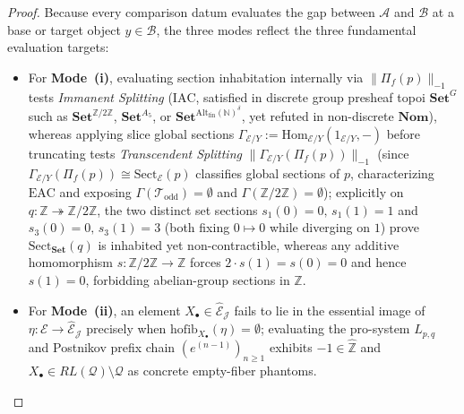 \documentclass[10pt,twoside,openright]{book}
\theoremstyle{crmplain}
\theoremstyle{crmdef}
\theoremstyle{crmremark}
\begin{document}
\begin{proof}
Because every comparison datum evaluates the gap between $\mathcal{A}$ and $\mathcal{B}$ at a base or target object $y \in \mathcal{B}$, the three modes reflect the three fundamental evaluation targets:
\begin{itemize}[leftmargin=1.4em,noitemsep,topsep=2pt]
  \item For \textbf{Mode~(i)}, evaluating section inhabitation internally via $\|\Pi_f(p)\|_{-1}$ tests \emph{Immanent Splitting} ($\mathrm{IAC}$, satisfied in discrete group presheaf topoi $\mathbf{Set}^G$ such as $\mathbf{Set}^{\mathbb{Z}/2\mathbb{Z}}$, $\mathbf{Set}^{A_5}$, or $\mathbf{Set}^{\mathrm{Alt}_{\mathrm{fin}}(\mathbb{N})^\delta}$, yet refuted in non-discrete $\mathbf{Nom}$), whereas applying slice global sections $\Gamma_{\mathcal{E}/Y} := \mathrm{Hom}_{\mathcal{E}/Y}(1_{\mathcal{E}/Y}, -)$ before truncating tests \emph{Transcendent Splitting} $\|\Gamma_{\mathcal{E}/Y}(\Pi_f(p))\|_{-1}$ (since $\Gamma_{\mathcal{E}/Y}(\Pi_f(p)) \cong \mathrm{Sect}_{\mathcal{E}}(p)$ classifies global sections of $p$, characterizing $\mathrm{EAC}$ and exposing $\Gamma(\mathcal{T}_{\mathrm{odd}}) = \emptyset$ and $\Gamma(\mathbb{Z}/2\mathbb{Z}) = \emptyset$); explicitly on $q : \mathbb{Z} \twoheadrightarrow \mathbb{Z}/2\mathbb{Z}$, the two distinct set sections $s_1(0) = 0,\, s_1(1) = 1$ and $s_3(0) = 0,\, s_3(1) = 3$ (both fixing $0 \mapsto 0$ while diverging on $1$) prove $\mathrm{Sect}_{\mathbf{Set}}(q)$ is inhabited yet non-contractible, whereas any additive homomorphism $s : \mathbb{Z}/2\mathbb{Z} \to \mathbb{Z}$ forces $2\cdot s(1) = s(0) = 0$ and hence $s(1) = 0$, forbidding abelian-group sections in $\mathbb{Z}$.
  \item For \textbf{Mode~(ii)}, an element $X_\bullet \in \widehat{\mathcal{E}}_{\mathcal{J}}$ fails to lie in the essential image of $\eta : \mathcal{E} \to \widehat{\mathcal{E}}_{\mathcal{J}}$ precisely when $\mathrm{hofib}_{X_\bullet}(\eta) = \emptyset$; evaluating the pro-system $L_{p,q}$ and Postnikov prefix chain $(e^{(n-1)})_{n \ge 1}$ exhibits $-1 \in \widehat{\mathbb{Z}}$ and $X_\bullet \in RL(\mathcal{Q}) \setminus \mathcal{Q}$ as concrete empty-fiber phantoms.

\end{itemize}
\end{proof}
\end{document}
